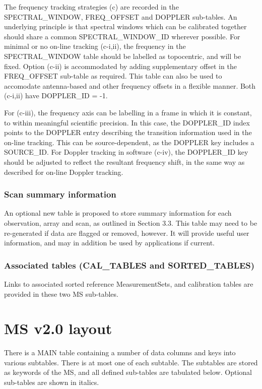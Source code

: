 \documentclass{article}
\begin{document}
The frequency tracking strategies (c) are recorded in the
SPECTRAL\_WINDOW, FREQ\_OFFSET and DOPPLER sub-tables. An underlying
principle is that spectral windows which can be calibrated together
should share a common SPECTRAL\_WINDOW\_ID wherever possible. For
minimal or no on-line tracking (c-i,ii), the frequency in the
SPECTRAL\_WINDOW table should be labelled as topocentric, and will be
fixed. Option (c-ii) is accommodated by adding supplementary offset in
the FREQ\_OFFSET sub-table as required. This table can also be used to
accomodate antenna-based and other frequency offsets in a flexible
manner. Both (c-i,ii) have DOPPLER\_ID = -1.

For (c-iii), the frequency axis can be labelling in a frame in which
it is constant, to within meaningful scientific precision. In this
case, the DOPPLER\_ID index points to the DOPPLER entry describing the
transition information used in the on-line tracking. This can be
source-dependent, as the DOPPLER key includes a SOURCE\_ID. For
Doppler tracking in software (c-iv), the DOPPLER\_ID key should be
adjusted to reflect the resultant frequency shift, in the same way
as described for on-line Doppler tracking.

\subsubsection{Scan summary information}

An optional new table is proposed to store summary information for
each observation, array and scan, as outlined in Section 3.3. This
table may need to be re-generated if data are flagged or removed,
however. It will provide useful user information, and may in addition
be used by applications if current.

\subsubsection{Associated tables (CAL\_TABLES and SORTED\_TABLES)}

Links to associated sorted reference MeasurementSets, and calibration
tables are provided in these two MS sub-tables.

\section{MS v2.0 layout}

There is a MAIN table containing a number of data columns and keys
into various subtables. There is at most one of each subtable. The
subtables are stored as keywords of the MS, and all defined sub-tables
are tabulated below.  Optional sub-tables are shown in italics.
\end{document}
